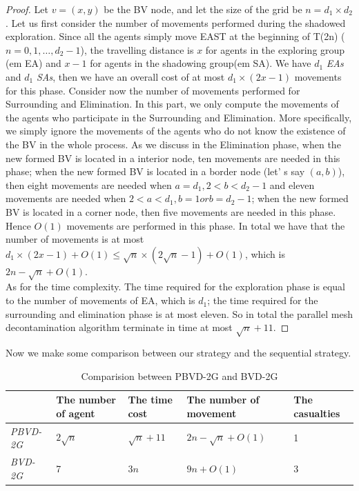 \begin{proof}
Let $v=(x, y)$ be the BV node, and let the size of the grid be $n=d_1\times d_2$. Let us first consider the number of movements performed during the shadowed exploration. Since all the agents simply move EAST at the beginning of T(2n) ($n=0,1, \dots , d_2-1$), the travelling distance is $x$ for agents in the exploring group ({em EA}) and $x-1$ for agents in the shadowing group({em SA}). We have $d_1$ {\em EAs} and $d_1$ {\em SAs}, then we have an overall cost of at most $d_1\times (2x-1)$ movements for this phase.
Consider now the number of movements performed for Surrounding and Elimination. In this part, we only compute the movements of the agents who participate in the Surrounding and Elimination. More specifically, we simply ignore the movements of the agents who do not know the existence of the BV in the whole process. As we discuss in the Elimination phase, when the new formed BV is located in a interior node, ten movements are needed in this phase; when the new formed BV is located in a border node (let' s say $(a, b)$), then eight movements are needed when $a=d_1, 2< b <d_2-1$ and eleven movements are needed when $2< a <d_1,b=1 or b=d_2-1$; when the new formed BV is located in a corner node, then five movements are needed in this phase. Hence $O(1)$ movements are performed in this phase.
In total we have that the number of movements is at most $d_1 \times(2x-1)+O(1)\leq \sqrt{n}\times(2\sqrt{n}-1)+O(1)$, which is $2n-\sqrt{n}+O(1)$.\\
As for the time complexity. The time required for the exploration phase is equal to the number of movements of EA, which is $d_1$; the time required for the surrounding and elimination phase is at most eleven. So in total the parallel mesh decontamination algorithm terminate in time at most $\sqrt{n}+11$. 
\end{proof}

Now we make some comparison between our strategy and the sequential strategy.

\begin{table} [hbtp]
\caption{Comparision between PBVD-2G and BVD-2G}
\label{table:ComparisionPBVD-2GandBVD-2G}
\centering
\tabulinesep=2mm
\begin{tabu} to 140 mm {|X[6,c]|X[4,l]|X[4,l]|X[4,l]|X[4,l]|} \hline 
& The number of agent & The time cost & The number of movement & The casualties \\ \hline
{\em PBVD-2G}   & $2\sqrt{n}$   & $\sqrt{n}+11$ & $2n-\sqrt{n}+O(1)$   & 1        \\ \hline
{\em BVD-2G} & 7    & $3n$          & $9n+O(1)$     & 3              \\ \hline
\end{tabu}
\end{table}

